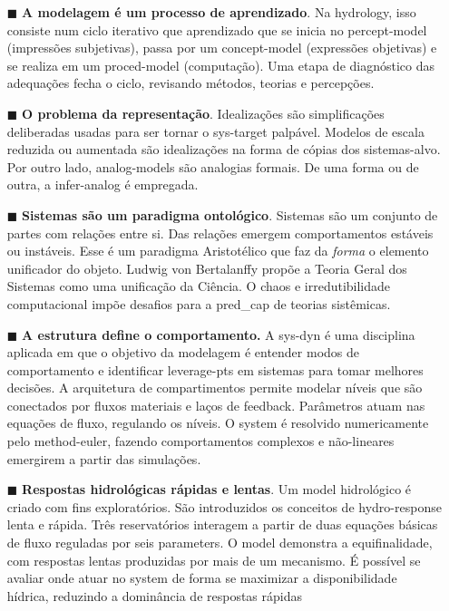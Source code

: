 \documentclass[./main.tex]{subfiles}
\begin{document}
\begin{itemize}
    \item[$\blacksquare$] \textbf{A modelagem é um processo de aprendizado}. Na \gls{hydrology}, isso consiste num ciclo iterativo que aprendizado que se inicia no \gls{percept-model} (impressões subjetivas), passa por um \gls{concept-model} (expressões objetivas) e se realiza em um \gls{proced-model} (computação). Uma etapa de diagnóstico das adequações fecha o ciclo, revisando métodos, teorias e percepções.    
    \item[$\blacksquare$] \textbf{O problema da representação}. Idealizações são simplificações deliberadas usadas para ser tornar o \gls{sys-target} palpável. Modelos de escala reduzida ou aumentada são idealizações na forma de cópias dos sistemas-alvo. Por outro lado, \gls{analog-models} são analogias formais. De uma forma ou de outra, a \gls{infer-analog} é empregada.
    
    \item[$\blacksquare$] \textbf{Sistemas são um \gls{paradigma} ontológico}. Sistemas são um conjunto de partes com relações entre si. Das relações emergem comportamentos estáveis ou instáveis. Esse é um \gls{paradigma} Aristotélico que faz da \textit{forma} o elemento unificador do objeto. Ludwig von Bertalanffy propõe a Teoria Geral dos Sistemas como uma unificação da Ciência. O \gls{chaos} e irredutibilidade computacional impõe desafios para a \gls{pred_cap} de teorias sistêmicas.
    
    \item[$\blacksquare$] \textbf{A estrutura define o comportamento.} A \gls{sys-dyn} é uma disciplina aplicada em que o objetivo da modelagem é entender modos de comportamento e identificar \gls{leverage-pts} em sistemas para tomar melhores decisões. A arquitetura de compartimentos permite modelar níveis que são conectados por fluxos materiais e laços de \gls{feedback}. Parâmetros atuam nas equações de fluxo, regulando os níveis. O \gls{system} é resolvido numericamente pelo \gls{method-euler}, fazendo comportamentos complexos e não-lineares emergirem a partir das simulações.    
    \item[$\blacksquare$] \textbf{Respostas hidrológicas rápidas e lentas}. Um \gls{model} hidrológico é criado com fins exploratórios. São introduzidos os conceitos de \gls{hydro-response} lenta e rápida. Três reservatórios interagem a partir de duas equações básicas de fluxo reguladas por seis \gls{parameters}. O \gls{model} demonstra a equifinalidade, com respostas lentas produzidas por mais de um mecanismo. É possível se avaliar onde atuar no \gls{system} de forma se maximizar a disponibilidade hídrica, reduzindo a dominância de respostas rápidas
    

\end{itemize}
\end{document}
